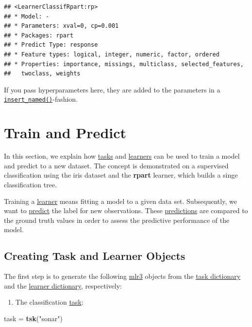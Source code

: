 \documentclass[]{scrbook}
\newenvironment{Shaded}{\begin{snugshade}}{\end{snugshade}}
\newcommand{\KeywordTok}[1]{\textcolor[rgb]{0.13,0.29,0.53}{\textbf{#1}}}
\newcommand{\NormalTok}[1]{#1}
\newcommand{\StringTok}[1]{\textcolor[rgb]{0.31,0.60,0.02}{#1}}
\providecommand{\tightlist}{%
  \setlength{\itemsep}{0pt}\setlength{\parskip}{0pt}}
\renewenvironment{Shaded} {\begin{snugshade}\small} {\end{snugshade}}
\begin{document}
\begin{verbatim}
## <LearnerClassifRpart:rp>
## * Model: -
## * Parameters: xval=0, cp=0.001
## * Packages: rpart
## * Predict Type: response
## * Feature types: logical, integer, numeric, factor, ordered
## * Properties: importance, missings, multiclass, selected_features,
##   twoclass, weights
\end{verbatim}

If you pass hyperparameters here, they are added to the parameters in a \href{https://mlr3misc.mlr-org.com/reference/insert_named.html}{\texttt{insert\_named()}}-fashion.

\hypertarget{train-predict}{%
\section{Train and Predict}\label{train-predict}}

In this section, we explain how \protect\hyperlink{tasks}{tasks} and \protect\hyperlink{learners}{learners} can be used to train a model and predict to a new dataset.
The concept is demonstrated on a supervised classification using the iris dataset and the \textbf{rpart} learner, which builds a singe classification tree.

Training a \protect\hyperlink{learners}{learner} means fitting a model to a given data set.
Subsequently, we want to \protect\hyperlink{predicting}{predict} the label for new observations.
These \protect\hyperlink{predicting}{predictions} are compared to the ground truth values in order to assess the predictive performance of the model.

\hypertarget{train-predict-objects}{%
\subsection{Creating Task and Learner Objects}\label{train-predict-objects}}

The first step is to generate the following \href{https://mlr3.mlr-org.com}{mlr3} objects from the \protect\hyperlink{tasks}{task dictionary} and the \protect\hyperlink{learners}{learner dictionary}, respectively:

\begin{enumerate}
\def\labelenumi{\arabic{enumi}.}
\tightlist
\item
  The classification \protect\hyperlink{tasks}{task}:
\end{enumerate}

\begin{Shaded}
\begin{Highlighting}[]
\NormalTok{task =}\StringTok{ }\KeywordTok{tsk}\NormalTok{(}\StringTok{"sonar"}\NormalTok{)}
\end{Highlighting}
\end{Shaded}
\end{document}
